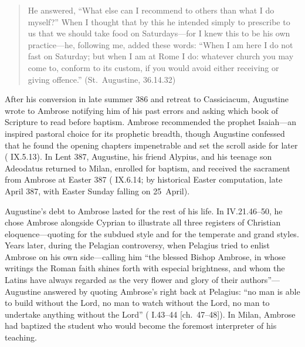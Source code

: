 \begin{quote}
He answered, ``What else can I recommend to others than what I do myself?'' When I thought that by this he intended simply to prescribe to us that we should take food on Saturdays---for I knew this to be his own practice---he, following me, added these words: ``When I am here I do not fast on Saturday; but when I am at Rome I do: whatever church you may come to, conform to its custom, if you would avoid either receiving or giving offence.'' (St.~Augustine,  36.14.32)
\end{quote}

After his conversion in late summer 386 and retreat to Cassiciacum, Augustine wrote to Ambrose notifying him of his past errors and asking which book of Scripture to read before baptism. Ambrose recommended the prophet Isaiah---an inspired pastoral choice for its prophetic breadth, though Augustine confessed that he found the opening chapters impenetrable and set the scroll aside for later ( IX.5.13). In Lent 387, Augustine, his friend Alypius, and his teenage son Adeodatus returned to Milan, enrolled for baptism, and received the sacrament from Ambrose at Easter 387 ( IX.6.14; by historical Easter computation, late April 387, with Easter Sunday falling on 25~April).

Augustine's debt to Ambrose lasted for the rest of his life. In  IV.21.46--50, he chose Ambrose alongside Cyprian to illustrate all three registers of Christian eloquence---quoting  for the subdued style and  for the temperate and grand styles. Years later, during the Pelagian controversy, when Pelagius tried to enlist Ambrose on his own side---calling him ``the blessed Bishop Ambrose, in whose writings the Roman faith shines forth with especial brightness, and whom the Latins have always regarded as the very flower and glory of their authors''---Augustine answered by quoting Ambrose's  right back at Pelagius: ``no man is able to build without the Lord, no man to watch without the Lord, no man to undertake anything without the Lord'' ( I.43--44 [ch.~47--48]). In Milan, Ambrose had baptized the student who would become the foremost interpreter of his teaching.
